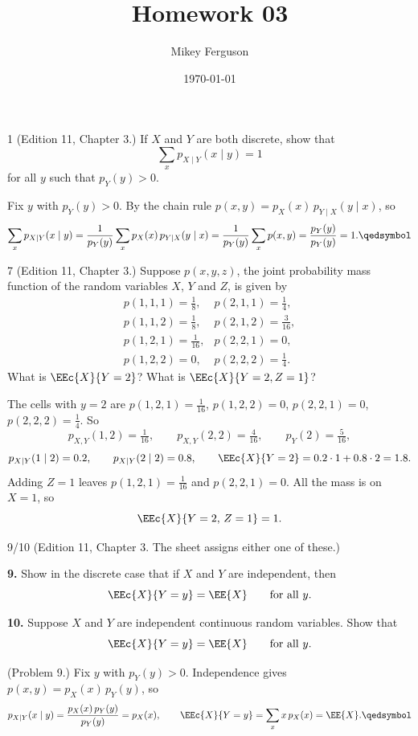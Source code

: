 \documentclass[11pt]{article}
\title{Homework 03}
\author{Mikey Ferguson}
\date{\today}
\begin{document}
\maketitle

\begin{problem}{1}
  (Edition 11, Chapter 3.) If $X$ and $Y$ are both discrete, show that
  \[
    \sum_{x} p_{X \mid Y}(x \mid y) = 1
  \]
  for all $y$ such that $p_Y(y) > 0$.
\end{problem}
Fix $y$ with $p_Y(y) > 0$. By the chain rule $p(x,y) = p_X(x)\,p_{Y \mid X}(y \mid x)$, so
\[
  \sum_{x} p_{X \mid Y}(x \mid y)
    = \frac{1}{p_Y(y)} \sum_{x} p_X(x)\,p_{Y \mid X}(y \mid x)
    = \frac{1}{p_Y(y)} \sum_{x} p(x,y)
    = \frac{p_Y(y)}{p_Y(y)} = 1. \qedsymbol
\]

\begin{problem}{7}
  (Edition 11, Chapter 3.) Suppose $p(x,y,z)$, the joint probability mass
  function of the random variables $X$, $Y$ and $Z$, is given by
  \[
    \begin{array}{ll}
      p(1,1,1) = \tfrac{1}{8},  & p(2,1,1) = \tfrac{1}{4},\\[2pt]
      p(1,1,2) = \tfrac{1}{8},  & p(2,1,2) = \tfrac{3}{16},\\[2pt]
      p(1,2,1) = \tfrac{1}{16}, & p(2,2,1) = 0,\\[2pt]
      p(1,2,2) = 0,             & p(2,2,2) = \tfrac{1}{4}.
    \end{array}
  \]
  What is $\EEc{X}{Y = 2}$? What is $\EEc{X}{Y = 2, Z = 1}$?
\end{problem}
The cells with $y = 2$ are $p(1,2,1) = \tfrac{1}{16}$, $p(1,2,2) = 0$, $p(2,2,1) = 0$, $p(2,2,2) = \tfrac14$. So
\[
  p_{X,Y}(1,2) = \tfrac{1}{16}, \qquad p_{X,Y}(2,2) = \tfrac{4}{16}, \qquad p_Y(2) = \tfrac{5}{16},
\]
\[
  p_{X \mid Y}(1 \mid 2) = 0.2, \qquad p_{X \mid Y}(2 \mid 2) = 0.8,
  \qquad \EEc{X}{Y = 2} = 0.2 \cdot 1 + 0.8 \cdot 2 = 1.8.
\]
Adding $Z = 1$ leaves $p(1,2,1) = \tfrac{1}{16}$ and $p(2,2,1) = 0$. All the mass is on $X = 1$, so
\[
  \EEc{X}{Y = 2,\, Z = 1} = 1.
\]

\begin{problem}{9/10}
  (Edition 11, Chapter 3. The sheet assigns either one of these.)

  \textbf{9.} Show in the discrete case that if $X$ and $Y$ are independent, then
  \[
    \EEc{X}{Y = y} = \EE{X} \qquad \text{for all } y.
  \]

  \textbf{10.} Suppose $X$ and $Y$ are independent continuous random variables.
  Show that
  \[
    \EEc{X}{Y = y} = \EE{X} \qquad \text{for all } y.
  \]
\end{problem}
(Problem 9.) Fix $y$ with $p_Y(y) > 0$. Independence gives $p(x,y) = p_X(x)\,p_Y(y)$, so
\[
  p_{X \mid Y}(x \mid y) = \frac{p_X(x)\,p_Y(y)}{p_Y(y)} = p_X(x),
  \qquad
  \EEc{X}{Y = y} = \sum_{x} x\, p_X(x) = \EE{X}. \qedsymbol
\]
\end{document}
